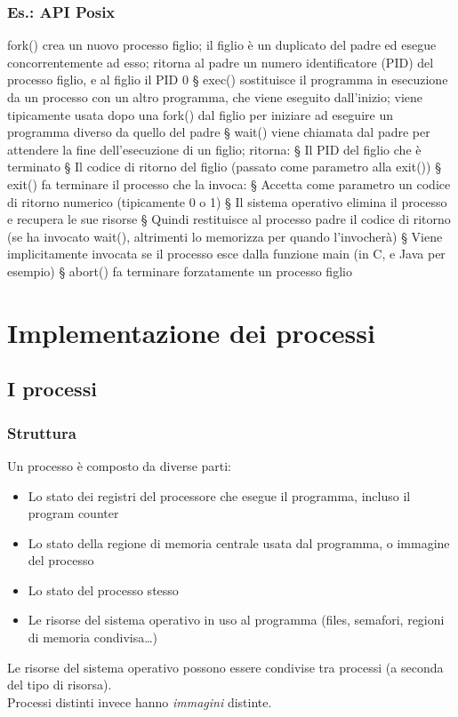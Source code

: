 \subsection{Es.: API Posix}
fork() crea un nuovo processo figlio; il figlio è un duplicato del padre ed esegue concorrentemente ad
esso; ritorna al padre un numero identificatore (PID) del processo figlio, e al figlio il PID 0
§ exec() sostituisce il programma in esecuzione da un processo con un altro programma, che viene eseguito
dall'inizio; viene tipicamente usata dopo una fork() dal figlio per iniziare ad eseguire un programma
diverso da quello del padre
§ wait() viene chiamata dal padre per attendere la fine dell'esecuzione di un figlio; ritorna:
§ Il PID del figlio che è terminato
§ Il codice di ritorno del figlio (passato come parametro alla exit())
§ exit() fa terminare il processo che la invoca:
§ Accetta come parametro un codice di ritorno numerico (tipicamente 0 o 1)
§ Il sistema operativo elimina il processo e recupera le sue risorse
§ Quindi restituisce al processo padre il codice di ritorno (se ha invocato wait(), altrimenti lo memorizza
per quando l'invocherà)
§ Viene implicitamente invocata se il processo esce dalla funzione main (in C, e Java per esempio)
§ abort() fa terminare forzatamente un processo figlio

\chapter{Implementazione dei processi}
\section{I processi}
\subsection{Struttura}
Un processo è composto da diverse parti:
\begin{itemize}
    \item Lo stato dei registri del processore che esegue il programma, incluso il program counter
    \item Lo stato della regione di memoria centrale usata dal programma, o immagine del processo
    \item Lo stato del processo stesso
    \item Le risorse del sistema operativo in uso al programma (files, semafori, regioni di memoria condivisa…)
\end{itemize}
Le risorse del sistema operativo possono essere condivise tra processi (a seconda del tipo di risorsa).
\\Processi distinti invece hanno \textit{immagini} distinte.

